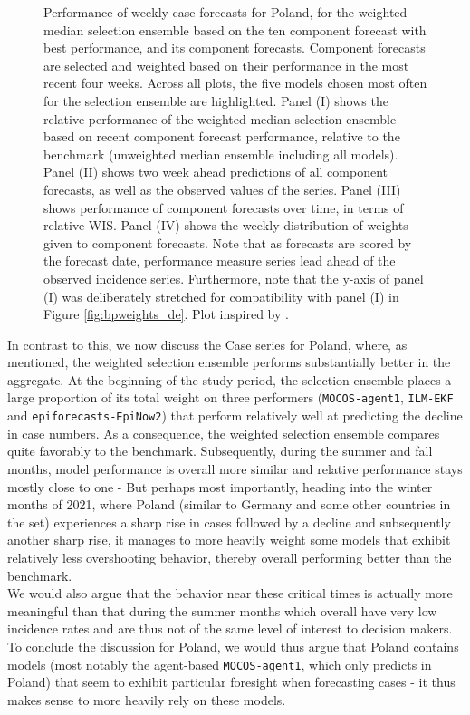 \begin{figure}
\caption{\footnotesize{Performance of weekly case forecasts for Poland, for the weighted median selection ensemble based on the ten component forecast with best performance, and its component forecasts. Component forecasts are selected and weighted based on their performance in the most recent four weeks. Across all plots, the five models chosen most often for the selection ensemble are highlighted. Panel (I) shows the relative performance of the weighted median selection ensemble based on recent component forecast performance, relative to the benchmark (unweighted median ensemble including all models). Panel (II) shows two week ahead predictions of all component forecasts, as well as the observed values of the series. Panel (III) shows performance of component forecasts over time, in terms of relative WIS. Panel (IV) shows the weekly distribution of weights given to component forecasts. Note that as forecasts are scored by the forecast date, performance measure series lead ahead of the observed incidence series. Furthermore, note that the y-axis of panel (I) was deliberately stretched for compatibility with panel (I) in Figure \ref{fig:bpweights_de}. Plot inspired by \cite{ray_comparing_2022}.}}
\label{fig:bpweights_pl}
\end{figure}
In contrast to this, we now discuss the Case series for Poland, where, as mentioned, the weighted selection ensemble performs substantially better in the aggregate. At the beginning of the study period, the selection ensemble places a large proportion of its total weight on three performers (\texttt{MOCOS-agent1}, \texttt{ILM-EKF} and \texttt{epiforecasts-EpiNow2}) that perform relatively well at predicting the decline in case numbers. As a consequence, the weighted selection ensemble compares quite favorably to the benchmark. Subsequently, during the summer and fall months, model performance is overall more similar and relative performance stays mostly close to one - %
But perhaps most importantly, heading into the winter months of 2021, where Poland (similar to Germany and some other countries in the set) experiences a sharp rise in cases followed by a decline and subsequently another sharp rise, it manages to more heavily weight some models that exhibit relatively less overshooting behavior, thereby overall performing better than the benchmark. \\We would also argue that the behavior near these critical times is actually more meaningful than that during the summer months which overall have very low incidence rates and are thus not of the same level of interest to decision makers. To conclude the discussion for Poland, we would thus argue that Poland contains models (most notably the agent-based \texttt{MOCOS-agent1}, which only predicts in Poland) that seem to exhibit particular foresight when forecasting cases - it thus makes sense to more heavily rely on these models. \\%
